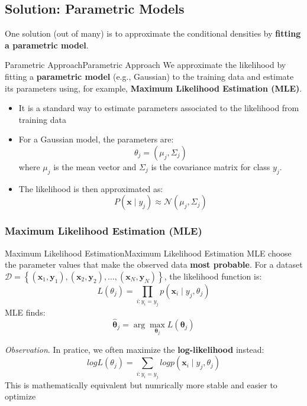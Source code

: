 \documentclass[a4paper]{article}
\theoremstyle{definition}
\begin{document}
\subsection{Solution: Parametric Models}
One solution (out of many) is to approximate the conditional densities by \textbf{fitting a parametric model}.
\begin{definition}{Parametric Approach}{Parametric Approach}
We approximate the likelihood by fitting a \textbf{parametric model} (e.g., Gaussian) to the training data and estimate its parameters using, for example,
\textbf{Maximum Likelihood Estimation (MLE)}.
\begin{itemize}
    \item It is a standard way to estimate parameters associated to the likelihood from training data 
    \item For a Gaussian model, the parameters are:
    \[
      \theta_j = (\mu_j, \Sigma_j)
    \]
    where \textbf{\( \mu_j \)} is the mean vector and \textbf{\( \Sigma_j \)} is the covariance matrix for class \( y_j \).
    \item The likelihood is then approximated as:
    \[
      P(\mathbf{x}\mid y_j) \approx \mathcal{N}(\mu_j,\Sigma_j)
    \]
\end{itemize}
\end{definition}
\subsubsection{Maximum Likelihood Estimation (MLE)}
\begin{definition}{Maximum Likelihood Estimation}{Maximum Likelihood Estimation}
MLE choose the parameter values that make the observed data \textbf{most probable}.
\vspace{1em}
\noindent
\newline
For a dataset \( \mathcal{D} = \left\{ (\mathbf{x}_1,\mathbf{y}_1),(\mathbf{x}_2,\mathbf{y}_2), \ldots, (\mathbf{x}_N,\mathbf{y}_N) \right\} \), the likelihood
function is:
\[
  L(\theta_j) = \prod_{i:y_i = y_j} p(\mathbf{x}_i \mid y_j, \theta_j)
\]
MLE finds:
\[
  \hat{\boldsymbol{\theta}}_j = \arg\max_{\boldsymbol{\theta}_j} L(\boldsymbol{\theta}_j)
\]
\end{definition}
\textit{Observation}. In pratice, we often maximize the \textbf{log-likelihood} instead:
\[
  log L(\theta_j) = \sum_{i: y_i = y_j} log p(\mathbf{x}_i \mid y_j, \theta_j)
\]
This is mathematically equivalent but numrically more stable and easier to optimize
\end{document}
